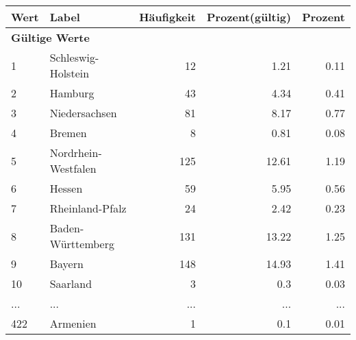      \begin{longtable}{lXrrr}
     \toprule
     \textbf{Wert} & \textbf{Label} & \textbf{Häufigkeit} & \textbf{Prozent(gültig)} & \textbf{Prozent} \\
     \endhead
     \midrule
     \multicolumn{5}{l}{\textbf{Gültige Werte}}\\
        1 & \multicolumn{1}{X}{Schleswig-Holstein} & %
          \num{12} &
          \num[round-mode=places,round-precision=2]{1,21} &
          \num[round-mode=places,round-precision=2]{0,11} \\
        2 & \multicolumn{1}{X}{Hamburg} & %
          \num{43} &
          \num[round-mode=places,round-precision=2]{4,34} &
          \num[round-mode=places,round-precision=2]{0,41} \\
        3 & \multicolumn{1}{X}{Niedersachsen} & %
          \num{81} &
          \num[round-mode=places,round-precision=2]{8,17} &
          \num[round-mode=places,round-precision=2]{0,77} \\
        4 & \multicolumn{1}{X}{Bremen} & %
          \num{8} &
          \num[round-mode=places,round-precision=2]{0,81} &
          \num[round-mode=places,round-precision=2]{0,08} \\
        5 & \multicolumn{1}{X}{Nordrhein-Westfalen} & %
          \num{125} &
          \num[round-mode=places,round-precision=2]{12,61} &
          \num[round-mode=places,round-precision=2]{1,19} \\
        6 & \multicolumn{1}{X}{Hessen} & %
          \num{59} &
          \num[round-mode=places,round-precision=2]{5,95} &
          \num[round-mode=places,round-precision=2]{0,56} \\
        7 & \multicolumn{1}{X}{Rheinland-Pfalz} & %
          \num{24} &
          \num[round-mode=places,round-precision=2]{2,42} &
          \num[round-mode=places,round-precision=2]{0,23} \\
        8 & \multicolumn{1}{X}{Baden-Württemberg} & %
          \num{131} &
          \num[round-mode=places,round-precision=2]{13,22} &
          \num[round-mode=places,round-precision=2]{1,25} \\
        9 & \multicolumn{1}{X}{Bayern} & %
          \num{148} &
          \num[round-mode=places,round-precision=2]{14,93} &
          \num[round-mode=places,round-precision=2]{1,41} \\
        10 & \multicolumn{1}{X}{Saarland} & %
          \num{3} &
          \num[round-mode=places,round-precision=2]{0,3} &
          \num[round-mode=places,round-precision=2]{0,03} \\
       ... & ... & ... & ... & ... \\
        422 & \multicolumn{1}{X}{Armenien} & %
          \num{1} &
          \num[round-mode=places,round-precision=2]{0,1} &
          \num[round-mode=places,round-precision=2]{0,01} \\


\end{longtable}
